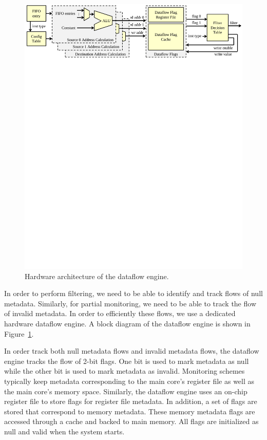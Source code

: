 \begin{figure}
  \begin{center}
    \includegraphics[width=\linewidth]{figs/dataflow_architecture.pdf}
    \vspace{-0.2in}
    \caption{Hardware architecture of the dataflow engine.}
    \label{fig:arch.dataflow} 
    \vspace{-0.1in}
  \end{center}
\end{figure}

In order to perform filtering, we need to be able to identify and track flows
of null metadata. Similarly, for partial monitoring,
 we need to be able to track the flow of invalid metadata. In
order to efficiently these flows, we use a dedicated hardware
dataflow engine. A block diagram of the dataflow engine is shown in
Figure~\ref{fig:arch.dataflow}.

In order track both null metadata flows and invalid metadata flows, the
dataflow engine tracks the flow of 2-bit flags. One bit is used to
mark metadata as null while the other bit is used to mark metadata as invalid.
Monitoring schemes typically keep metadata corresponding to the main core's
register file as well as the main core's memory space. Similarly, the dataflow
engine uses an on-chip register file to store flags for register file metadata.
In addition, a set of flags are stored that correspond to memory metadata.
These memory metadata flags are accessed through a cache and backed to main
memory. All flags are initialized as null and valid when the system starts. 

